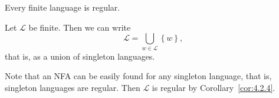 \documentclass{notes}
\begin{document}
\begin{cor}
  Every finite language is regular.
\end{cor}

\begin{prf}
  Let $\mathcal L$ be finite.
  Then we can write 
  \[
    \mathcal L = \bigcup_{w \in \mathcal L} \left \{ w \right \}, 
  \]
  that is, as a union of singleton languages.

  Note that an NFA can be easily found for any singleton language, that is, singleton languages are regular.
  Then $\mathcal L$ is regular by Corollary~\ref{cor:4.2.4}.
\end{prf}
\end{document}
